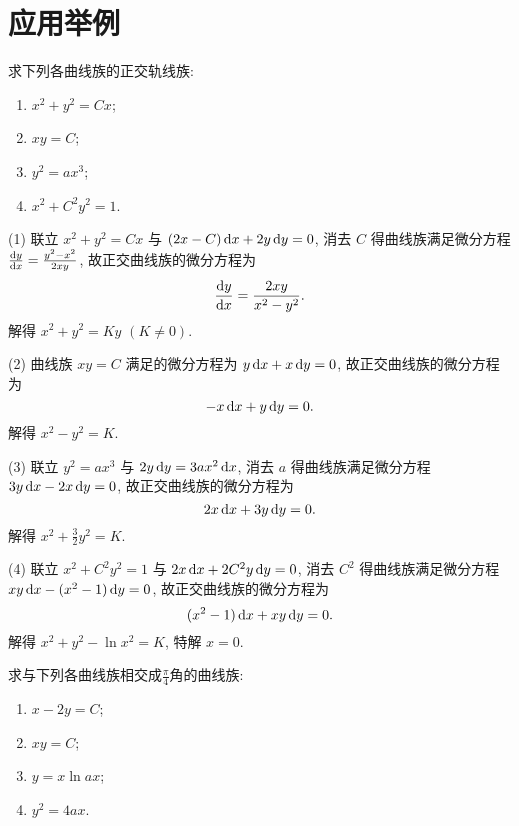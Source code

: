 \section{应用举例}



\begin{exercise}
  求下列各曲线族的正交轨线族:
  \begin{enumerate}[(1)]
  \item $x^2+y^2=Cx$;
  \item $xy=C$;
  \item $y^2=ax^3$;
  \item $x^2+C^2y^2=1$.
  \end{enumerate}
\end{exercise}

\begin{solve}
  (1) 联立 $x^2+y^2=Cx$ 与 $(2x-C)\mathop{}\!\mathrm{d} x+2y\mathop{}\!\mathrm{d} y=0$,
  消去 $C$ 得曲线族满足微分方程 $\frac{\mathop{}\!\mathrm{d} y}{\mathop{}\!\mathrm{d} x}=\frac{y^2-x^2}{2xy}$,
  故正交曲线族的微分方程为
  \[\frac{\mathop{}\!\mathrm{d} y}{\mathop{}\!\mathrm{d} x}=\frac{2xy}{x^2-y^2}.\]
  解得 $x^2+y^2=Ky$ $(K\neq 0)$.

  (2) 曲线族 $xy=C$ 满足的微分方程为 $y\mathop{}\!\mathrm{d} x+x\mathop{}\!\mathrm{d} y=0$, 故正交曲线族的微分方程为
  \[-x\mathop{}\!\mathrm{d} x+y\mathop{}\!\mathrm{d} y=0.\]
  解得 $x^2-y^2=K$.

  (3) 联立 $y^2=ax^3$ 与 $2y\mathop{}\!\mathrm{d} y=3ax^2\mathop{}\!\mathrm{d} x$,
  消去 $a$ 得曲线族满足微分方程 $3y\mathop{}\!\mathrm{d} x-2x\mathop{}\!\mathrm{d} y=0$, 故正交曲线族的微分方程为
  \[2x\mathop{}\!\mathrm{d} x+3y\mathop{}\!\mathrm{d} y=0.\]
  解得 $x^2+\frac{3}{2}y^2=K$.

  (4) 联立 $x^2+C^2y^2=1$ 与 $2x\mathop{}\!\mathrm{d} x+2C^2y\mathop{}\!\mathrm{d} y=0$,
  消去 $C^2$ 得曲线族满足微分方程 $xy\mathop{}\!\mathrm{d} x-(x^2-1)\mathop{}\!\mathrm{d} y=0$, 故正交曲线族的微分方程为
  \[(x^2-1)\mathop{}\!\mathrm{d} x+xy\mathop{}\!\mathrm{d} y=0.\]
  解得 $x^2+y^2-\ln x^2=K$, 特解 $x=0$.
\end{solve}



\begin{exercise}
  求与下列各曲线族相交成$\frac{\pi}{4}$角的曲线族:
  \begin{enumerate}[(1)]
  \item $x-2y=C$;
  \item $xy=C$;
  \item $y=x\ln ax$;
  \item $y^2=4ax$.
  \end{enumerate}
\end{exercise}

